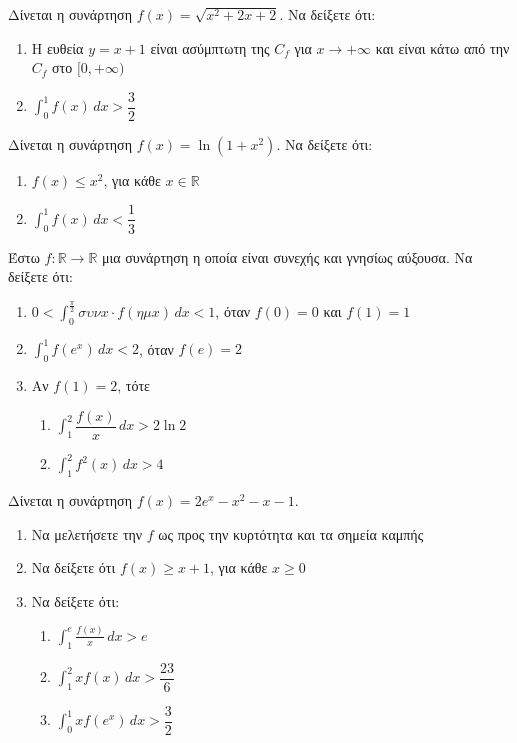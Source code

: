 \documentclass{presentation}
\begin{document}
\begin{askisi}
  Δίνεται η συνάρτηση $f(x)=\sqrt{x^2+2x+2}$. Να δείξετε ότι:
  \begin{enumerate}[<+->]
    \item Η ευθεία $y=x+1$ είναι ασύμπτωτη της $C_f$ για $x\to +\infty$ και είναι κάτω από την $C_f$ στο $[0,+\infty)$
    \item $\int_{0}^{1}f(x)\, dx>\dfrac{3}{2}$
  \end{enumerate}
\end{askisi}

\begin{askisi}
  Δίνεται η συνάρτηση $f(x)=\ln (1+x^2)$. Να δείξετε ότι:
  \begin{enumerate}[<+->]
    \item $f(x)\le x^2$, για κάθε $x\in \mathbb{R}$
    \item $\int_{0}^{1}f(x)\, dx<\dfrac{1}{3}$
  \end{enumerate}
\end{askisi}

\begin{askisi}
  Έστω $f:\mathbb{R}\to \mathbb{R}$ μια συνάρτηση η οποία είναι συνεχής και γνησίως αύξουσα. Να δείξετε ότι:
  \begin{enumerate}[<+->]
    \item $0<\int_{0}^{\frac{\pi}{2}}συνx\cdot f(ημx)\, dx<1$, όταν $f(0)=0$ και $f(1)=1$
    \item $\int_{0}^{1}f(e^x)\, dx<2$, όταν $f(e)=2$
    \item Αν $f(1)=2$, τότε
          \begin{enumerate}[<+->]
            \item $\int_{1}^{2}\dfrac{f(x)}{x}\, dx>2\ln 2$
            \item $\int_{1}^{2}f^2(x)\, dx>4$
          \end{enumerate}
  \end{enumerate}
\end{askisi}

\begin{askisi}
  Δίνεται η συνάρτηση $f(x)=2e^x-x^2-x-1$.
  \begin{enumerate}[<+->]
    \item Να μελετήσετε την $f$ ως προς την κυρτότητα και τα σημεία καμπής
    \item Να δείξετε ότι $f(x)\ge x+1$, για κάθε $x\ge 0$
    \item Να δείξετε ότι:
          \begin{enumerate}[<+->]
            \item $\int_{1}^{e}\frac{f(x)}{x}\, dx>e$
            \item $\int_{1}^{2}xf(x)\, dx>\dfrac{23}{6}$
            \item $\int_{0}^{1}xf(e^x)\, dx>\dfrac{3}{2}$
          \end{enumerate}
  \end{enumerate}
\end{askisi}
\end{document}
